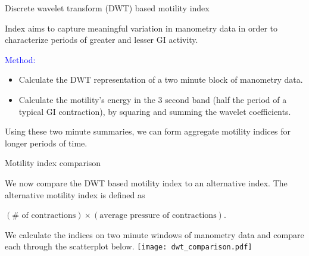 \documentclass[handout]{beamer}
\begin{document}
\begin{frame}{Discrete wavelet transform (DWT) based motility index}

\small

Index aims to capture meaningful variation in manometry data in order to characterize periods of greater and lesser GI activity.

\bigskip

\textcolor{blue}{Method: }
\begin{itemize}
  \item Calculate the DWT representation of a two minute block of manometry data. 
  \item Calculate the motility's energy in the 3 second band (half the period of a typical GI contraction), by squaring and summing the wavelet coefficients.
\end{itemize}

\bigskip

Using these two minute summaries, we can form aggregate motility indices for longer periods of time.



\end{frame}


\begin{frame}{Motility index comparison}

\small

We now compare the DWT based motility index to an alternative index. The alternative motility index is defined as

\begin{center}
$(\#\text{ of contractions}) \times (\text{average pressure of contractions})$.
\end{center}

We calculate the indices on two minute windows of manometry data and compare each through the scatterplot below.
\texttt{[image: dwt\_comparison.pdf]}

\end{frame}
\end{document}
